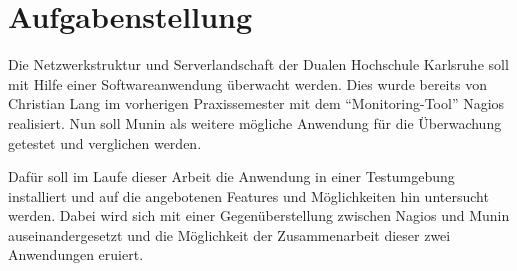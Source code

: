 \section{Aufgabenstellung}

Die Netzwerkstruktur und Serverlandschaft der Dualen Hochschule Karlsruhe soll mit Hilfe einer Softwareanwendung überwacht werden.
Dies wurde bereits von Christian Lang im vorherigen Praxissemester mit dem "`Monitoring-Tool"' Nagios realisiert.
Nun soll Munin als weitere mögliche Anwendung für die Überwachung getestet und verglichen werden.

Dafür soll im Laufe dieser Arbeit die Anwendung in einer Testumgebung installiert und auf die angebotenen Features und Möglichkeiten hin untersucht werden.
Dabei wird sich mit einer Gegenüberstellung zwischen Nagios und Munin auseinandergesetzt und die Möglichkeit der Zusammenarbeit dieser zwei Anwendungen eruiert.